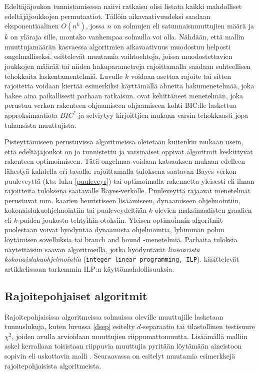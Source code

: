 Edeltäjäjoukon tunnistamisessa naiivi ratkaisu olisi listata kaikki mahdolliset edeltäjäjoukkojen permutaatiot. Tällöin aikavaativuudeksi saadaan eksponentiaalinen $O(n^k)$, jossa $n$ on solmujen eli satunnaismuuttujien määrä ja $k$ on yläraja sille, montako vanhempaa solmulla voi olla. Nähdään, että mallin muuttujamäärän kasvaessa algoritmien aikavaativuus muodostuu helposti ongelmalliseksi. \citet{scanagatta_survey_2019} esittelevät muutamia vaihtoehtoja, joissa muodostettavien joukkojen määrää tai niiden hakuparametreja rajoittamalla saadaan suhteellisen tehokkaita laskentamentelmiä. Luvulle $k$ voidaan asettaa rajoite tai sitten rajoitetta voidaan kiertää esimerkiksi käyttämällä ahnetta hakumenetelmää, joka hakee aina paikallisesti parhaan ratkaisun. \citet{scanagatta_learning_2015} ovat kehittäneet menetelmän, joka perustuu verkon rakenteen ohjaamiseen ohjaamiseen kohti BIC:lle laskettua approksimaatiota $BIC^*$ ja  selviytyy kirjoittjien mukaan varsin tehokkaasti jopa tuhansista muuttujista. 

Pisteyttämiseen perustuvissa algoritmeissa oletetaan kuitenkin \citet{scanagatta_survey_2019} mukaan usein, että edeltäjäjoukot on jo tunnistettu ja varsinaiset oppivat algoritmit keskittyvät rakenteen optimoimiseen. Tätä ongelmaa voidaan katsauksen mukaan edelleen lähestyä kahdella eri tavalla: rajoittamalla tuloksena saatavan Bayes-verkon puuleveyttä (kts. luku \ref{puuleveys}) tai optimoimalla rakennetta yleisesti eli ilman rajoitteita tuloksena saatavalle Bayes-verkolle. Puuleveyttä rajaavat menetelmät perustuvat mm. kaarien heuristiseen lisäämiseen, dynaamiseen ohjelmointiin, kokonaislukuohjelmointiin tai puuleveydeltään $k$ olevien maksimaalisten graafien eli $k$-puiden joukosta tehtyihin otoksiin. Yleisen optimoinnin algoritmit puolestaan voivat hyödyntää dynaamista ohjelmointia, lyhimmän polun löytämisen sovelluksia tai branch and bound -menetelmiä. Parhaita tuloksia näytettäisiin saavan algoritmeilla, jotka hyödyntävät \emph{lineaarista kokonaislukuohjelmointia} (\texttt{integer linear programming, ILP}). \citet{bartlett_integer_2017} käsittelevät artikkelissaan tarkemmin  ILP:n käyttömahdollisuuksia.

\subsection{Rajoitepohjaiset algoritmit}

Rajoitepohjaisissa algoritmeissa solmuissa oleville muuttujille lasketaan tunnuslukuja, kuten luvussa \ref{dsep} esitelty $d$-separaatio tai tilastollinen testisuure $\chi^2$, joiden avulla arvioidaan muuttujien riippumattomuutta. Lisäämällä malliin askel kerrallaan toisistaan riippuvia muuttujia pyritään löytämään aineistoon sopivin eli uskottavin malli \citep{ramsahai_connecting_2020, scutari_learning_2010}. Seuraavassa on esitelyt muutamia esimerkkejä rajoitepohjaisista algoritmeista.


